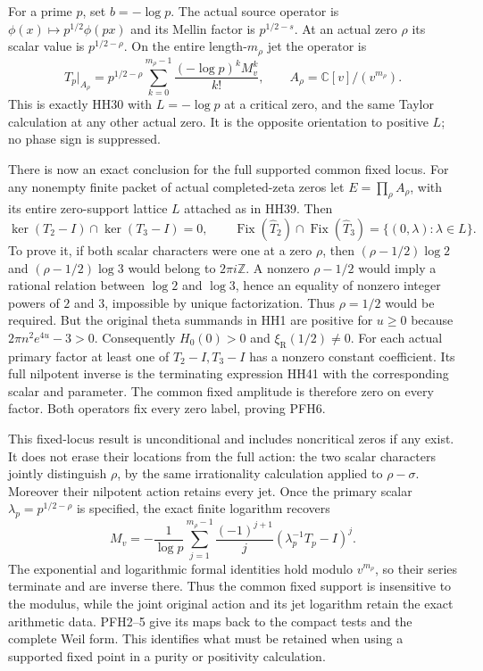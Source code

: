 \documentclass[11pt,a4paper]{article}
\theoremstyle{definition}\newtheorem{definition}[theorem]{Definition}
\begin{document}
For a prime $p$, set $b=-\log p$. The actual source operator is
$\phi(x)\mapsto p^{1/2}\phi(px)$ and its Mellin factor is
$p^{1/2-s}$. At an actual zero $\rho$ its scalar value is
$p^{1/2-\rho}$. On the entire length-$m_\rho$ jet the operator is
\[
 T_p|_{A_\rho}
   =p^{1/2-\rho}
      \sum_{k=0}^{m_\rho-1}
                \frac{(-\log p)^k M_v^k}{k!},
       \qquad A_\rho=\mathbb C[v]/(v^{m_\rho}).
 \tag{PFH5}
\]
This is exactly HH30 with $L=-\log p$ at a critical zero, and
the same Taylor calculation at any other actual zero. It is the
opposite orientation to positive $L$; no phase sign is suppressed.

There is now an exact conclusion for the full supported common
fixed locus. For any nonempty finite packet of actual completed-zeta
zeros let $E=\prod_\rho A_\rho$, with its entire zero-support
lattice $L$ attached as in HH39. Then
\[
 \boxed{\ker(T_2-I)\cap\ker(T_3-I)=0,\qquad
    \operatorname{Fix}(\widehat T_2)\cap
    \operatorname{Fix}(\widehat T_3)
         =\{(0,\lambda):\lambda\in L\}.}
 \tag{PFH6}
\]
To prove it, if both scalar characters were one at a zero $\rho$,
then $(\rho-1/2)\log2$ and $(\rho-1/2)\log3$ would belong to
$2\pi i\mathbb Z$. A nonzero $\rho-1/2$ would imply a rational
relation between $\log2$ and $\log3$, hence an equality of nonzero
integer powers of $2$ and $3$, impossible by unique factorization.
Thus $\rho=1/2$ would be required. But the original theta summands
in HH1 are positive for $u\ge0$ because $2\pi n^2e^{4u}-3>0$.
Consequently $H_0(0)>0$ and $\xi_{\mathrm R}(1/2)\ne0$.
For each actual primary factor at least one of $T_2-I,T_3-I$
has a nonzero constant coefficient. Its full nilpotent inverse is
the terminating expression HH41 with the corresponding scalar and
parameter. The common fixed amplitude is therefore zero on every
factor. Both operators fix every zero label, proving PFH6.

This fixed-locus result is unconditional and includes noncritical
zeros if any exist. It does not erase their locations from the full
action: the two scalar characters jointly distinguish $\rho$, by
the same irrationality calculation applied to $\rho-\sigma$.
Moreover their nilpotent action retains every jet. Once the primary
scalar $\lambda_p=p^{1/2-\rho}$ is specified, the exact finite
logarithm recovers
\[
 M_v=-\frac1{\log p}\sum_{j=1}^{m_\rho-1}
           \frac{(-1)^{j+1}}j
           (\lambda_p^{-1}T_p-I)^j.
 \tag{PFH7}
\]
The exponential and logarithmic formal identities hold modulo
$v^{m_\rho}$, so their series terminate and are inverse there.
Thus the common fixed support is insensitive to the modulus, while
the joint original action and its jet logarithm retain the exact
arithmetic data. PFH2--5 give its maps back to the compact tests and
the complete Weil form. This identifies what must be retained when
using a supported fixed point in a purity or positivity calculation.
\end{document}
